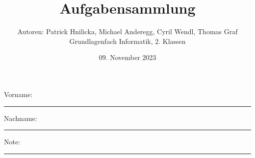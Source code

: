 \newtoggle{withbonus} \toggletrue{withbonus} %

\newcommand{\mycourse}{Grundlagenfach Informatik}
\newcommand{\myclass}{2. Klassen}
\newcommand{\mydate}{09. November 2023}

\title{\textbf{Aufgabensammlung}}
\author{Autoren: Patrick Hnilicka, Michael Anderegg, Cyril Wendl, Thomas Graf\\
\mycourse, \myclass}
\date{\mydate}
\maketitle
\thispagestyle{headandfoot}		

\begin{center}
\end{center}
\vspace{10mm}

\begin{center}
	Vorname: \rule{45mm}{0.8pt}\qquad Nachname: \rule{45mm}{0.8pt}
\end{center}
\vspace{20mm}

\begin{center}
	\iftoggle{withbonus} {
		\combinedgradetable[h][questions]
	} {
		\gradetable[h][questions]
	}
\end{center}
\vspace{15mm}
\begin{center}
	Note: 
	\vspace{10mm}
	
	\rule{8mm}{1.2pt}
\end{center}
\clearpage


